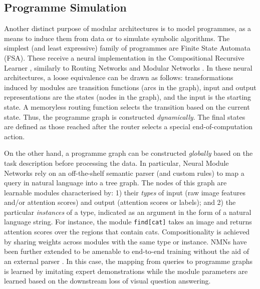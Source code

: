 \documentclass[10pt]{article} %
\begin{document}
\subsection{Programme Simulation}
\label{ssec:programme}
Another distinct purpose of modular architectures is to model programmes, as a means to induce them from data or to simulate symbolic algorithms. The simplest (and least expressive) family of programmes are Finite State Automata (FSA). These receive a neural implementation in the Compositional Recursive Learner \citep[CRL;][]{chang2018automatically}, similarly to Routing Networks \citep{rosenbaum2017routing} and
Modular Networks \citep{kirsch2018modular}. In these neural architectures, a loose equivalence can be drawn as follows: transformations induced by modules are transition functions (arcs in the graph), input and output representations are the states (nodes in the graph), and the input is the starting state. A memoryless routing function selects the transition based on the current state. Thus, the programme graph is constructed \textit{dynamically}. The final states are defined as those reached after the router selects a special end-of-computation action.

On the other hand, a programme graph can be constructed \textit{globally} based on the task description before processing the data. In particular, Neural Module Networks \citep[NMNs;][]{andreas2016nmn,andreas2016learning} rely on an off-the-shelf semantic parser (and custom rules) to map a query in natural language into a tree graph. The nodes of this graph are learnable modules characterised by: 1) their \textit{types} of input (raw image features and/or attention scores) and output (attention scores or labels); and 2) the particular \textit{instances} of a type, indicated as an argument in the form of a natural language string. For instance, the module \texttt{find[cat]} takes an image and returns attention scores over the regions that contain cats. Compositionality is achieved by sharing weights across modules with the same type or instance. NMNs have been further extended to be amenable to end-to-end training without the aid of an external parser \citep{Hu_2017_ICCV}. In this case, the mapping from queries to programme graphs is learned by imitating expert demonstrations while the module parameters are learned based on the downstream loss of visual question answering.
\end{document}
